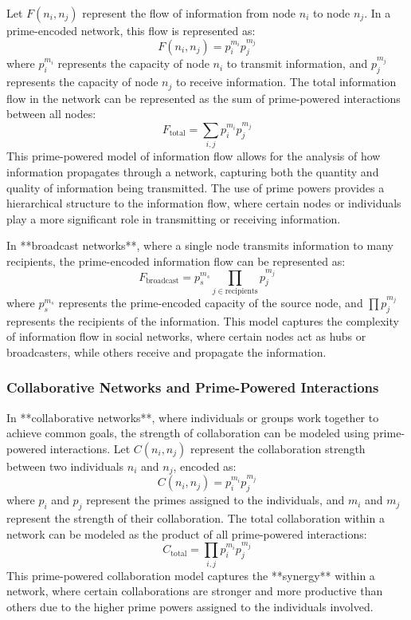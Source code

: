 \documentclass[12pt]{article}
\begin{document}
Let \( F(n_i, n_j) \) represent the flow of information from node \( n_i \) to node \( n_j \). In a prime-encoded network, this flow is represented as:
\[
F(n_i, n_j) = p_i^{m_i} p_j^{m_j}
\]
where \( p_i^{m_i} \) represents the capacity of node \( n_i \) to transmit information, and \( p_j^{m_j} \) represents the capacity of node \( n_j \) to receive information. The total information flow in the network can be represented as the sum of prime-powered interactions between all nodes:
\[
F_{\text{total}} = \sum_{i,j} p_i^{m_i} p_j^{m_j}
\]
This prime-powered model of information flow allows for the analysis of how information propagates through a network, capturing both the quantity and quality of information being transmitted. The use of prime powers provides a hierarchical structure to the information flow, where certain nodes or individuals play a more significant role in transmitting or receiving information.

In **broadcast networks**, where a single node transmits information to many recipients, the prime-encoded information flow can be represented as:
\[
F_{\text{broadcast}} = p_s^{m_s} \prod_{j \in \text{recipients}} p_j^{m_j}
\]
where \( p_s^{m_s} \) represents the prime-encoded capacity of the source node, and \( \prod p_j^{m_j} \) represents the recipients of the information. This model captures the complexity of information flow in social networks, where certain nodes act as hubs or broadcasters, while others receive and propagate the information.

\subsubsection{Collaborative Networks and Prime-Powered Interactions}

In **collaborative networks**, where individuals or groups work together to achieve common goals, the strength of collaboration can be modeled using prime-powered interactions. Let \( C(n_i, n_j) \) represent the collaboration strength between two individuals \( n_i \) and \( n_j \), encoded as:
\[
C(n_i, n_j) = p_i^{m_i} p_j^{m_j}
\]
where \( p_i \) and \( p_j \) represent the primes assigned to the individuals, and \( m_i \) and \( m_j \) represent the strength of their collaboration. The total collaboration within a network can be modeled as the product of all prime-powered interactions:
\[
C_{\text{total}} = \prod_{i,j} p_i^{m_i} p_j^{m_j}
\]
This prime-powered collaboration model captures the **synergy** within a network, where certain collaborations are stronger and more productive than others due to the higher prime powers assigned to the individuals involved.
\end{document}
